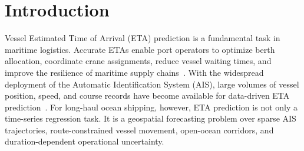 \documentclass[sigconf,anonymous]{acmart}%
\begin{document}



\maketitle

\section{Introduction}

Vessel Estimated Time of Arrival (ETA) prediction is a fundamental task in maritime logistics.
Accurate ETAs enable port operators to optimize berth allocation, coordinate crane assignments, reduce vessel waiting times, and improve the resilience of maritime supply chains~\cite{unctad2023}.
With the widespread deployment of the Automatic Identification System (AIS), large volumes of vessel position, speed, and course records have become available for data-driven ETA prediction~\cite{fang2022}.
For long-haul ocean shipping, however, ETA prediction is not only a time-series regression task.
It is a geospatial forecasting problem over sparse AIS trajectories, route-constrained vessel movement, open-ocean corridors, and duration-dependent operational uncertainty.
\end{document}
